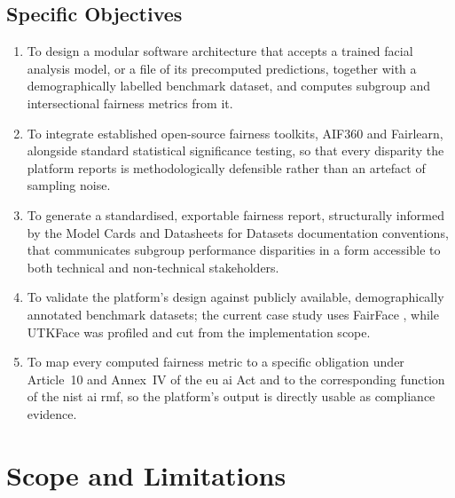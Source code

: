 \subsection{Specific Objectives}
\begin{enumerate}
    \item To design a modular software architecture that accepts a trained facial analysis model, or a file of its precomputed predictions, together with a demographically labelled benchmark dataset, and computes subgroup and intersectional fairness metrics from it.
    \item To integrate established open-source fairness toolkits, AIF360 and Fairlearn, alongside standard statistical significance testing, so that every disparity the platform reports is methodologically defensible rather than an artefact of sampling noise.
    \item To generate a standardised, exportable fairness report, structurally informed by the Model Cards \cite{mitchell2019modelcards} and Datasheets for Datasets \cite{gebru2018datasheets} documentation conventions, that communicates subgroup performance disparities in a form accessible to both technical and non-technical stakeholders.
    \item To validate the platform's design against publicly available, demographically annotated benchmark datasets; the current case study uses FairFace \cite{karkkainen2021fairface}, while UTKFace was profiled and cut from the implementation scope.
    \item To map every computed fairness metric to a specific obligation under Article~10 and Annex~IV of the \gls{eu} \gls{ai} Act and to the corresponding function of the \gls{nist} \gls{ai} \gls{rmf}, so the platform's output is directly usable as compliance evidence.
\end{enumerate}

\section{Scope and Limitations}

